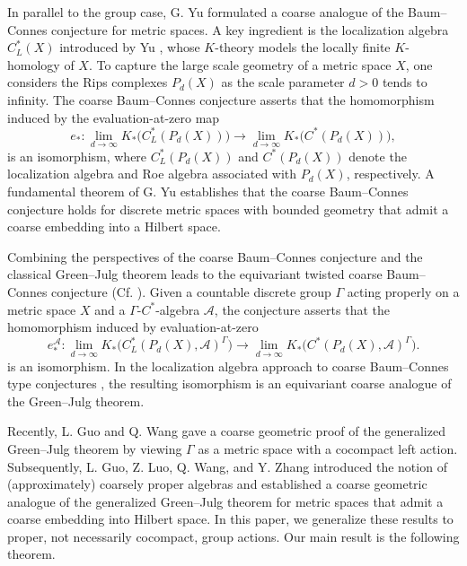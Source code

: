 \documentclass[pdflatex]{sn-jnl}
\theoremstyle{plain}
\theoremstyle{definition}
\begin{document}
In parallel to the group case, G. Yu \cite{Yu95} formulated a coarse analogue of the Baum--Connes conjecture for metric spaces. A key ingredient is the localization algebra $C_{L}^{*}(X)$ introduced by Yu \cite{Yu97}, whose $K$-theory models the locally finite $K$-homology of $X$. To capture the large scale geometry of a metric space $X$, one considers the Rips complexes $P_{d}(X)$ as the scale parameter $d>0$ tends to infinity. The coarse Baum–Connes conjecture asserts that the homomorphism induced by the evaluation-at-zero map
\[e_{*}:\lim_{d\to\infty} K_{*}\bigl(C_{L}^{*}(P_{d}(X))\bigr)\longrightarrow\lim_{d\to\infty} K_{*}\bigl(C^{*}(P_{d}(X))\bigr),\]
is an isomorphism, where $C_{L}^{*}(P_{d}(X))$ and $C^{*}(P_{d}(X))$ denote the localization algebra \cite{Yu97} and Roe algebra \cite{Roe93} associated with $P_{d}(X)$, respectively. A fundamental theorem of G. Yu \cite{Yu00} establishes that the coarse Baum–Connes conjecture holds for discrete metric spaces with bounded geometry that admit a coarse embedding into a Hilbert space.

Combining the perspectives of the coarse Baum--Connes conjecture and the classical Green--Julg theorem leads to the equivariant twisted coarse Baum--Connes conjecture (Cf. \cite{GLWZ23, FZ24, DFW24}). 
Given a countable discrete group $\Gamma$ acting properly on a metric space $X$ and a $\Gamma$-$C^{*}$-algebra $\mathcal{A}$, the conjecture asserts that the homomorphism induced by evaluation-at-zero
\[e_{*}^{\mathcal{A}}:\lim_{d\to\infty} K_{*}\bigl(C_{L}^{*}(P_{d}(X),\mathcal{A})^\Gamma\bigr) \longrightarrow\lim_{d\to\infty} K_{*}\bigl(C^{*}(P_{d}(X),\mathcal{A})^\Gamma\bigr).\]
is an isomorphism.
In the localization algebra approach to coarse Baum--Connes type conjectures \cite{Yu97,Yu00}, the resulting isomorphism is an equivariant coarse analogue of the Green--Julg theorem. 

Recently, L. Guo and Q. Wang \cite{guo2022coarsegeometricapproachgeneralised} gave a coarse geometric proof of the generalized Green--Julg theorem by viewing $\Gamma$ as a metric space with a cocompact left action. Subsequently, L. Guo, Z. Luo, Q. Wang, and Y. Zhang \cite{GLWZ23} introduced the notion of (approximately) coarsely proper algebras and established a coarse geometric analogue of the generalized Green--Julg theorem for metric spaces that admit a coarse embedding into Hilbert space.
In this paper, we generalize these results to proper, not necessarily cocompact, group actions. Our main result is the following theorem.
\end{document}

